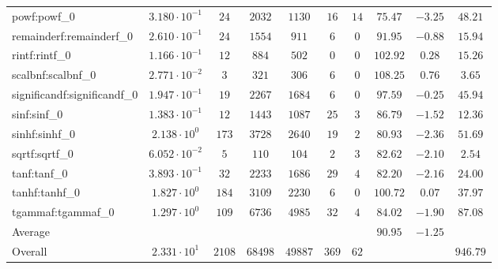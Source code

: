 \begin{tabular}{|l|c|c|c|c|c|c|c|c|c|}
powf:powf\_0                 & $ 3.180 \cdot 10^{-1} $ & $ 24     $ & $ 2032  $ & $ 1130  $ & $ 16  $ & $ 14 $ & $ 75.47       $ & $ -3.25   $ & $ 48.21   $ \\
remainderf:remainderf\_0     & $ 2.610 \cdot 10^{-1} $ & $ 24     $ & $ 1554  $ & $ 911   $ & $ 6   $ & $ 0  $ & $ 91.95       $ & $ -0.88   $ & $ 15.94   $ \\
rintf:rintf\_0               & $ 1.166 \cdot 10^{-1} $ & $ 12     $ & $ 884   $ & $ 502   $ & $ 0   $ & $ 0  $ & $ 102.92      $ & $ 0.28    $ & $ 15.26   $ \\
scalbnf:scalbnf\_0           & $ 2.771 \cdot 10^{-2} $ & $ 3      $ & $ 321   $ & $ 306   $ & $ 6   $ & $ 0  $ & $ 108.25      $ & $ 0.76    $ & $ 3.65    $ \\
significandf:significandf\_0 & $ 1.947 \cdot 10^{-1} $ & $ 19     $ & $ 2267  $ & $ 1684  $ & $ 6   $ & $ 0  $ & $ 97.59       $ & $ -0.25   $ & $ 45.94   $ \\
sinf:sinf\_0                 & $ 1.383 \cdot 10^{-1} $ & $ 12     $ & $ 1443  $ & $ 1087  $ & $ 25  $ & $ 3  $ & $ 86.79       $ & $ -1.52   $ & $ 12.36   $ \\
sinhf:sinhf\_0               & $ 2.138 \cdot 10^{0}  $ & $ 173    $ & $ 3728  $ & $ 2640  $ & $ 19  $ & $ 2  $ & $ 80.93       $ & $ -2.36   $ & $ 51.69   $ \\
sqrtf:sqrtf\_0               & $ 6.052 \cdot 10^{-2} $ & $ 5      $ & $ 110   $ & $ 104   $ & $ 2   $ & $ 3  $ & $ 82.62       $ & $ -2.10   $ & $ 2.54    $ \\
tanf:tanf\_0                 & $ 3.893 \cdot 10^{-1} $ & $ 32     $ & $ 2233  $ & $ 1686  $ & $ 29  $ & $ 4  $ & $ 82.20       $ & $ -2.16   $ & $ 24.00   $ \\
tanhf:tanhf\_0               & $ 1.827 \cdot 10^{0}  $ & $ 184    $ & $ 3109  $ & $ 2230  $ & $ 6   $ & $ 0  $ & $ 100.72      $ & $ 0.07    $ & $ 37.97   $ \\
tgammaf:tgammaf\_0           & $ 1.297 \cdot 10^{0}  $ & $ 109    $ & $ 6736  $ & $ 4985  $ & $ 32  $ & $ 4  $ & $ 84.02       $ & $ -1.90   $ & $ 87.08   $ \\
\hline
Average                      & $                     $ & $        $ & $       $ & $       $ & $     $ & $    $ & $ 90.95       $ & $ -1.25   $ & $         $ \\
\hline
Overall                      & $ 2.331 \cdot 10^{1}  $ & $ 2108   $ & $ 68498 $ & $ 49887 $ & $ 369 $ & $ 62 $ & $             $ & $         $ & $ 946.79  $ \\
\hline
\end{tabular}
